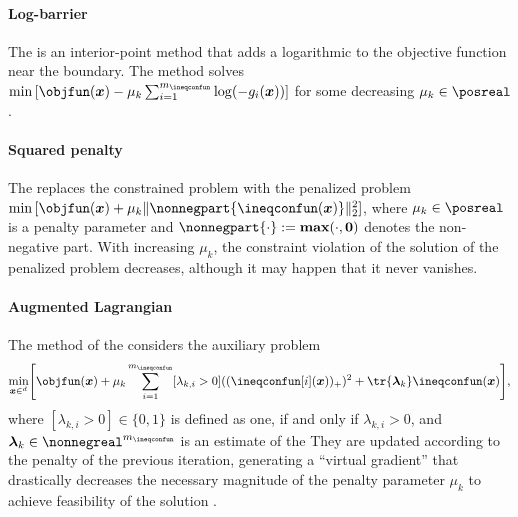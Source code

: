 \paragraph{Log-barrier}

The 
is an interior-point method that adds
a logarithmic  to the objective function
near the boundary.
The method solves
$\min\, [\objfun(\*x) - \mu_k \sum_{i=1}^{m_{\ineqconfun}} \log(-g_i(\*x))]$
for some decreasing $\mu_k \in \posreal$.

\paragraph{Squared penalty}

The 
replaces the constrained problem with the penalized problem
$\min\, [\objfun(\*x) + \mu_k \norm[2]{\nonnegpart{\ineqconfun(\*x)}}^2]$,
where $\mu_k \in \posreal$ is a penalty parameter and
$\nonnegpart{\cdot} := \*\max(\cdot, \*0)$ denotes the non-negative part.
With increasing $\mu_k$, the constraint violation of the solution of
the penalized problem decreases, although it may happen
that it never vanishes.

\paragraph{Augmented Lagrangian}

The method of the 
considers the auxiliary problem
\begin{equation}
  \min_{\*x \in \real^d} \bracket*{
    \objfun(\*x) + \mu_k \sum_{i=1}^{m_{\ineqconfun}} [\lambda_{k,i} > 0]
    ((\ineqconfun[i](\*x))_{+})^2 + \tr{\*\lambda_k} \ineqconfun(\*x)
  },
\end{equation}
where $[\lambda_{k,i} > 0] \in \{0, 1\}$ is defined as one,
if and only if $\lambda_{k,i} > 0$, and
$\*\lambda_k \in \nonnegreal^{m_{\ineqconfun}}$ is an estimate of the
They are updated according to the penalty of the previous iteration,
generating a ``virtual gradient'' that drastically decreases
the necessary magnitude of the penalty parameter $\mu_k$
to achieve feasibility of the solution \cite{Toussaint15Introduction}.

